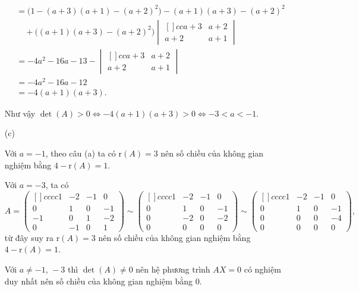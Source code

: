 \begin{enumerate}
{\begin{align*}
            & = \Big(1-(a+3)(a+1) - (a+2)^2\Big) - (a+1)(a+3) - (a+2)^2 \\ 
            & \quad + \Big((a+1)(a+3) - (a+2)^2\Big)\begin{vmatrix}[]{cc}
                a+3 & a+2 \\
                a+2 & a+1 
            \end{vmatrix} \\
            & = -4a^2 - 16a - 13 - \begin{vmatrix}[]{cc}
                a+3 & a+2 \\
                a+2 & a+1 
            \end{vmatrix} \\
            & = -4a^2 - 16a - 12 \\
            & = -4(a+1)(a+3).
        \end{align*}

        Như vậy $\det (A) > 0 \iff -4(a+1)(a+3) > 0 \iff -3 < a < -1$.
    }
    \item[(c)] {
        Với $a = -1$, theo câu (a) ta có $\text{r}(A) = 3$ nên số chiều của không gian nghiệm bằng $4 - \text{r}(A) = 1$.

        Với $a = -3$, ta có $$A = \begin{pmatrix}[]{cccc}
            1 & -2 & -1 & 0 \\
            0 & 1 & 0 & -1 \\
            -1 & 0 & 1 & -2 \\
            0 & -1 & 0 & 1 
        \end{pmatrix} \sim \begin{pmatrix}[]{cccc}
            1 & -2 & -1 & 0 \\
            0 & 1 & 0 & -1 \\
            0 & -2 & 0 & -2 \\
            0 & 0 & 0 & 0 
        \end{pmatrix} \sim \begin{pmatrix}[]{cccc}
            1 & -2 & -1 & 0 \\
            0 & 1 & 0 & -1 \\
            0 & 0 & 0 & -4 \\
            0 & 0 & 0 & 0 
        \end{pmatrix},$$ từ đây suy ra $\text{r}(A) = 3$ nên số chiều của không gian nghiệm bằng $4 - \text{r}(A) = 1$.

        Với $a \ne -1,\,-3$ thì $\det (A) \ne 0$ nên hệ phương trình $AX = 0$ có nghiệm duy nhất nên số chiều của không gian nghiệm bằng 0.
    }
\end{enumerate}

